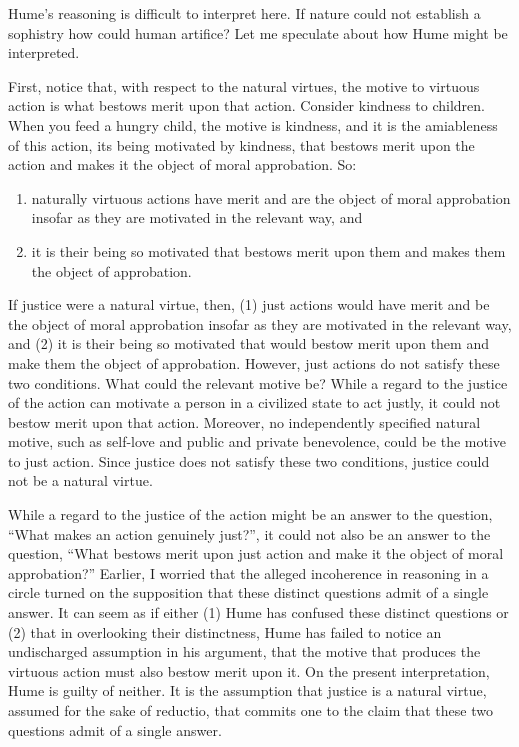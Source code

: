 Hume’s reasoning is difficult to interpret here. If nature could not establish a sophistry how could human artifice? Let me speculate about how Hume might be interpreted.

First, notice that, with respect to the natural virtues, the motive to virtuous action is what bestows merit upon that action. Consider kindness to children. When you feed a hungry child, the motive is kindness, and it is the amiableness of this action, its being motivated by kindness, that bestows merit upon the action and makes it the object of moral approbation. So: 
\begin{enumerate}
    \item naturally virtuous actions have merit and are the object of moral approbation insofar as they are motivated in the relevant way, and 
    \item it is their being so motivated that bestows merit upon them and makes them the object of approbation.
\end{enumerate}


If justice were a natural virtue, then, (1) just actions would have merit and be the object of moral approbation insofar as they are motivated in the relevant way, and (2) it is their being so motivated that would bestow merit upon them and make them the object of approbation. However, just actions do not satisfy these two conditions. What could the relevant motive be? While a regard to the justice of the action can motivate a person in a civilized state to act justly, it could not bestow merit upon that action. Moreover, no independently specified natural motive, such as self-love and public and private benevolence, could be the motive to just action. Since justice does not satisfy these two conditions, justice could not be a natural virtue.

While a regard to the justice of the action might be an answer to the question, ``What makes an action genuinely just?'', it could not also be an answer to the question, ``What bestows merit upon just action and make it the object of moral approbation?'' Earlier, I worried that the alleged incoherence in reasoning in a circle turned on the supposition that these distinct questions admit of a single answer. It can seem as if either (1) Hume has confused these distinct questions or (2) that in overlooking their distinctness, Hume has failed to notice an undischarged assumption in his argument, that the motive that produces the virtuous action must also bestow merit upon it. On the present interpretation, Hume is guilty of neither. It is the assumption that justice is a natural virtue, assumed for the sake of reductio, that commits one to the claim that these two questions admit of a single answer. \change

